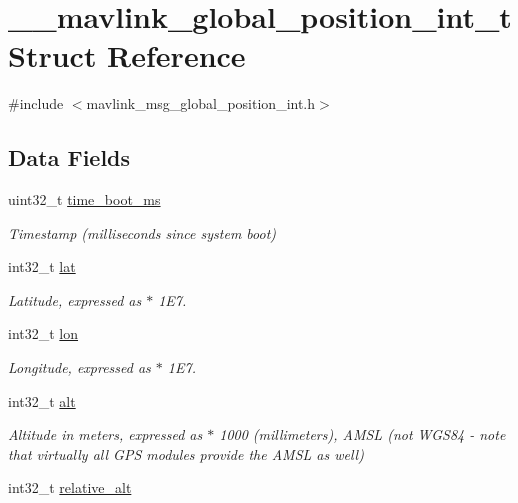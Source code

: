\hypertarget{struct____mavlink__global__position__int__t}{\section{\+\_\+\+\_\+mavlink\+\_\+global\+\_\+position\+\_\+int\+\_\+t Struct Reference}
\label{struct____mavlink__global__position__int__t}
}


{\ttfamily \#include $<$mavlink\+\_\+msg\+\_\+global\+\_\+position\+\_\+int.\+h$>$}

\subsection*{Data Fields}
\begin{DoxyCompactItemize}
\item 
uint32\+\_\+t \hyperlink{struct____mavlink__global__position__int__t_a1b56c431f19cff6fadc2b0ac3b5959b6}{time\+\_\+boot\+\_\+ms}
\begin{DoxyCompactList}\small\item\em Timestamp (milliseconds since system boot) \end{DoxyCompactList}\item 
int32\+\_\+t \hyperlink{struct____mavlink__global__position__int__t_a949653d08153161bb49b94794169a70f}{lat}
\begin{DoxyCompactList}\small\item\em Latitude, expressed as $\ast$ 1\+E7. \end{DoxyCompactList}\item 
int32\+\_\+t \hyperlink{struct____mavlink__global__position__int__t_a2350bdf8af429bc2ed49b7cfac61cee7}{lon}
\begin{DoxyCompactList}\small\item\em Longitude, expressed as $\ast$ 1\+E7. \end{DoxyCompactList}\item 
int32\+\_\+t \hyperlink{struct____mavlink__global__position__int__t_a1d9e69a26dc214bd624c9474ca3d79f4}{alt}
\begin{DoxyCompactList}\small\item\em Altitude in meters, expressed as $\ast$ 1000 (millimeters), A\+M\+S\+L (not W\+G\+S84 -\/ note that virtually all G\+P\+S modules provide the A\+M\+S\+L as well) \end{DoxyCompactList}\item 
int32\+\_\+t \hyperlink{struct____mavlink__global__position__int__t_a1b3d36234adcacbedc88c37c1712f4b1}{relative\+\_\+alt}

\end{DoxyCompactItemize}
